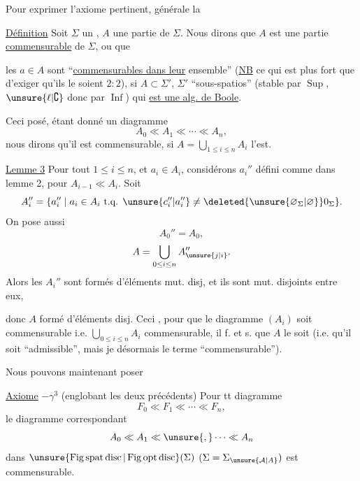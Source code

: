Pour exprimer l'axiome pertinent,  générale la

\uline{Définition} Soit $\Sigma$ un ,  $A$ une partie de $\Sigma$. Nous dirons que $A$ est une partie \uline{commensurable} de $\Sigma$, ou que 


les $a\in A$ sont ``\uline{commensurables dans leur} ensemble'' (\uline{NB} ce qui est plus fort que d'exiger qu'ils le soient $2:2$), si $A\subset\Sigma'$, $\Sigma'$   ``sous-spatios'' (stable par $\operatorname{Sup}$, $\unsure{\ell|\complement}$ donc par $\operatorname{Inf}$) qui \uline{est une alg. de Boole}.

Ceci posé, étant donné un diagramme
\[
A_0\ll A_1\ll\cdots\ll A_n,
\]
nous dirons qu'il est commensurable, si $A=\bigcup_{1\leq i\leq n}A_i$ l'est.


\uline{Lemme 3} Pour tout $1\leq i\leq n$, et $a_i\in A_i$, considérons $a_i''$ défini comme dans lemme 2, pour $A_{i-1}\ll A_i$. Soit
\[
A_i''=\{a_i''\mid a_i\in A_i\text{ t.q. }\unsure{c_i''|a_i''}\ne\deleted{\unsure{\varnothing_\Sigma|\varnothing}}0_\Sigma\}.
\]
 On pose aussi
\[
A_0''=A_0,
\]
\[
A=\bigcup_{0\leq i\leq n}A_{\unsure{j|i}}''.
\]
Alors les $A_i''$ sont formés d'éléments  mut. disj, et ils sont mut. disjoints entre eux,


donc $A$ formé d'éléments  disj. Ceci , pour que le diagramme $(A_i)$ soit commensurable i.e. $\bigcup_{0\leq i\leq n}A_i$ commensurable, il f. et s. que $A$ le soit (i.e. qu'il soit ``admissible'', mais je  désormais le terme ``commensurable'').

Nous pouvons maintenant poser

\uline{Axiome} \uline{ $-\gamma^3$} (englobant les deux précédents) Pour tt diagramme
\[
F_0\ll F_1\ll\cdots\ll F_n,
\]
le diagramme correspondant
\[
A_0\ll A_1\ll\unsure{,}\cdots\ll A_n
\]
dans $\unsure{\operatorname{Fig\,spat\,disc}|\operatorname{Fig\,opt\,disc}}(\Sigma)$ $(\Sigma=\Sigma_{\unsure{\mathcal A|A}})$ est commensurable.

